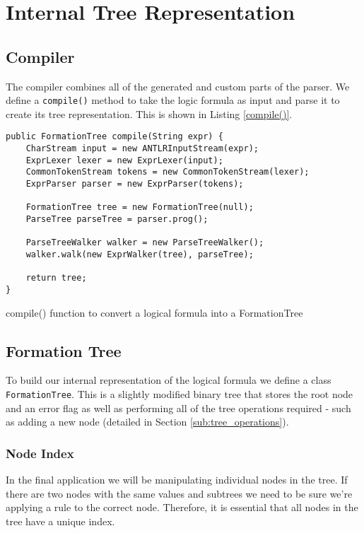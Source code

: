 \documentclass{report}
\begin{document}
\chapter{Internal Tree Representation}

\section{Compiler}
\label{sec:compiler}

The compiler combines all of the generated and custom parts of the parser. We define a {\tt compile()} method to take the logic formula as input and parse it to create its tree representation. This is shown in Listing \ref{compile()}.

\begin{listing}[ht]
\begin{verbatim}
public FormationTree compile(String expr) {
    CharStream input = new ANTLRInputStream(expr);
    ExprLexer lexer = new ExprLexer(input);
    CommonTokenStream tokens = new CommonTokenStream(lexer);
    ExprParser parser = new ExprParser(tokens);
    
    FormationTree tree = new FormationTree(null);
    ParseTree parseTree = parser.prog();
    
    ParseTreeWalker walker = new ParseTreeWalker();
    walker.walk(new ExprWalker(tree), parseTree);

    return tree;
}
\end{verbatim}
\caption{compile() function to convert a logical formula into a FormationTree}
\label{compile()}
\end{listing}

\section{Formation Tree}
\label{sec:formation_tree}

To build our internal representation of the logical formula we define a class {\tt FormationTree}. This is a slightly modified binary tree that stores the root node and an error flag as well as performing all of the tree operations required - such as adding a new node (detailed in Section \ref{sub:tree_operations}).

\subsection{Node Index}
\label{sub:node_index}

In the final application we will be manipulating individual nodes in the tree. If there are two nodes with the same values and subtrees we need to be sure we're applying a rule to the correct node. Therefore, it is essential that all nodes in the tree have a unique index.
\end{document}
